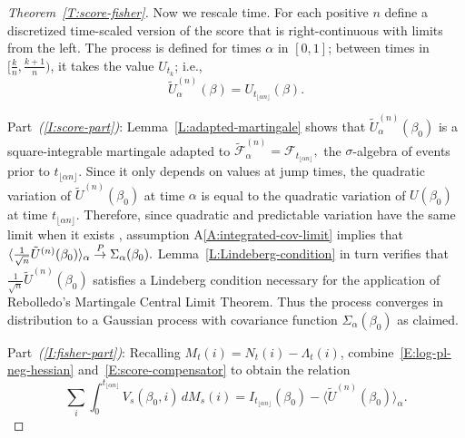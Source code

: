 \documentclass[final]{statsoc}
\begin{document}
\begin{proof}[Theorem~\ref{T:score-fisher}]
Now we rescale time.  For each positive $n$ define a discretized time-scaled
version of the score that is right-continuous with limits from the left.
The process is defined for times $\alpha$ in $[0,1]$; between times in
$[\tfrac{k}{n}, \tfrac{k+1}{n})$, it takes the value $U_{t_k}$; i.e.,
\begin{equation}\label{E:score-time-scaled}
    \tilde U_{\alpha}^{(n)}(\beta)
        = U_{t_{\lfloor \alpha n \rfloor}}(\beta).
\end{equation}

Part~\textit{(\ref{I:score-part})}:
Lemma~\ref{L:adapted-martingale} shows that $\tilde U_\alpha^{(n)}(\beta_0)$
is a square-integrable martingale adapted to
\(
    \mathcal{\tilde F}^{(n)}_\alpha
        =
        \mathcal{F}_{t_{\lfloor \alpha n \rfloor}},
\)
the $\sigma$-algebra of events prior to
$t_{\lfloor \alpha n \rfloor}$.
Since it only depends on values at jump times, the
quadratic variation of $\tilde U^{(n)}(\beta_0)$ at time $\alpha$ is
equal to the quadratic variation of $U(\beta_0)$ at time
$t_{\lfloor \alpha n \rfloor}$.  Therefore, since quadratic and
predictable variation have the same limit when it exists
\citep[Prop.~1]{rebolledo1980central}, assumption
A\ref{A:integrated-cov-limit} implies that
\(
    \langle \frac{1}{\sqrt{n}} \tilde U^{(n)}(\beta_0) \rangle_\alpha
        \overset{\mathit{P}}{\to}
            \Sigma_\alpha(\beta_0).
\)
Lemma~\ref{L:Lindeberg-condition} in turn verifies that
$\frac{1}{\sqrt{n}} \tilde U^{(n)}(\beta_0)$ satisfies a Lindeberg
condition necessary for the application of Rebolledo's \citeyearpar{rebolledo1980central} Martingale Central
Limit Theorem.  Thus the process converges in
distribution to a Gaussian process with covariance function
$\Sigma_\alpha(\beta_0)$ as claimed.

Part~\textit{(\ref{I:fisher-part})}:
Recalling $M_t(i) = N_t(i) - \Lambda_t(i)$,
combine~\eqref{E:log-pl-neg-hessian} and~\eqref{E:score-compensator}
to obtain the relation
\begin{equation}\label{E:var-estimate-relation}
            \sum_i
            \int_0^{t_{\lfloor \alpha n \rfloor}}
                V_s(\beta_0, i) \, dM_s(i)
        =
            I_{t_{\lfloor \alpha n \rfloor}}(\beta_0)
        -
            \big\langle \tilde U^{(n)}(\beta_0) \big\rangle_\alpha.
\end{equation}


\end{proof}
\end{document}
